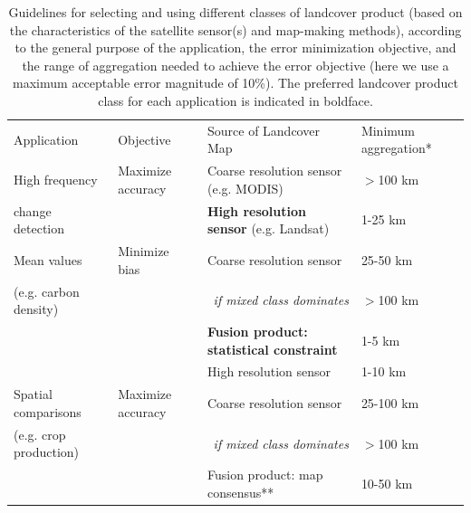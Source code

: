 \documentclass[a4paper]{article}
\begin{document}
\begin{table}[!h]
  \begin{threeparttable}
    \caption{Guidelines for selecting and using different classes of landcover product (based on the characteristics of the satellite sensor(s) and map-making methods), according to the general purpose of the application, the error minimization objective, and the range of aggregation needed to achieve the error objective (here we use a maximum acceptable error magnitude of 10\%). The preferred landcover product class for each application is indicated in boldface. }
    \begin{center}
      \begin{tabular*}{\textwidth}{m{3.5cm}m{3cm}m{5.5cm}m{2.25cm}}
       \hline
Application                     & Objective & Source of Landcover Map & Minimum aggregation* \\
\Xhline{1pt}
High frequency            & Maximize accuracy   & Coarse resolution sensor (e.g. MODIS) & $>$100 km\\
change detection                                                               &                                  & \textbf{High resolution sensor} (e.g. Landsat)   &  1-25 km\\
\hline
Mean values         & Minimize bias            & Coarse resolution sensor  & 25-50 km \\
(e.g. carbon density)                                                              &                                   &  \multicolumn{1}{r}{\emph{if mixed class dominates}}                                    & $>$100 km \\
                                                              &                                   & \textbf{Fusion product: statistical constraint} & 1-5 km\\
                                                              &                                   & High resolution sensor & 1-10 km\\
\hline
Spatial comparisons & Maximize accuracy  & Coarse resolution sensor & 25-100 km\\
 (e.g. crop production)                                                               &                                   &  \multicolumn{1}{r}{\emph{if mixed class dominates}}                                    & $>$100 km \\
                                                             &                                   & Fusion product: map consensus** & 10-50 km\\

\end{tabular*}
\end{center}
\end{threeparttable}
\end{table}
\end{document}
